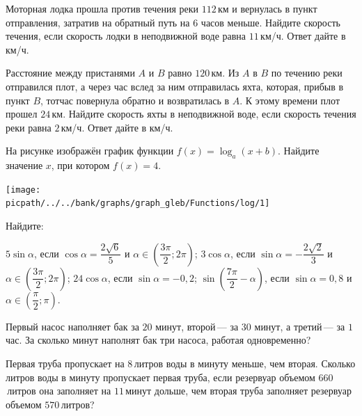 \begin{homework}[number=4]
	\begin{listofex}
		\item Моторная лодка прошла против течения реки \(112\) км и вернулась в пункт отправления, затратив на обратный путь на \(6\) часов меньше. Найдите скорость течения, если скорость лодки в неподвижной воде равна \(11\) км/ч. Ответ дайте в км/ч.
		\item Расстояние между пристанями \(A\) и \(B\) равно \(120\) км. Из \(A\) в \(B\) по течению реки отправился плот, а через час вслед за ним отправилась яхта, которая, прибыв в пункт \(B\), тотчас повернула обратно и возвратилась в \(A\). К этому времени плот прошел \(24\) км. Найдите скорость яхты в неподвижной воде, если скорость течения реки равна \(2\) км/ч. Ответ дайте в км/ч.
		\item
		\begin{minipage}[t]{0.6\linewidth}
			На рисунке изображён график функции \(f(x)=\log_a (x+b)\). Найдите значение \(x\), при котором \(f(x)=4\).
		\end{minipage}
		\begin{minipage}[t]{0.35\linewidth}
			\texttt{[image: \\picpath/../../bank/graphs/graph\_gleb/Functions/log/1]}
		\end{minipage}
		\item Найдите:
		\begin{tasks}
			\task \( 5\sin\alpha \), если \( \cos\alpha=\dfrac{2\sqrt{6}}{5} \) и \( \alpha\in\left( \dfrac{3\pi}{2}; 2\pi \right) \);
			\task \( 3\cos\alpha \), если \( \sin\alpha=-\dfrac{2\sqrt{2}}{3} \) и \( \alpha\in\left( \dfrac{3\pi}{2}; 2\pi \right) \);
			\task \( 24\cos\alpha \), если \( \sin\alpha=-0,2 \);
			\task \( \sin\left( \dfrac{7\pi}{2}-\alpha \right) \), если \( \sin\alpha=0,8 \) и \( \alpha\in\left( \dfrac{\pi}{2}; \pi \right) \).
		\end{tasks}
		\item Первый насос наполняет бак за \(20\) минут, второй --- за \(30\) минут, а третий --- за \(1\) час. За сколько минут наполнят бак три насоса, работая одновременно?
		\item Первая труба пропускает на \(8\) литров воды в минуту меньше, чем вторая. Сколько литров воды в минуту пропускает первая труба, если резервуар объемом \(660\) литров она заполняет на \(11\) минут дольше, чем вторая труба заполняет резервуар объемом \(570\) литров?
	\end{listofex}
\end{homework}
